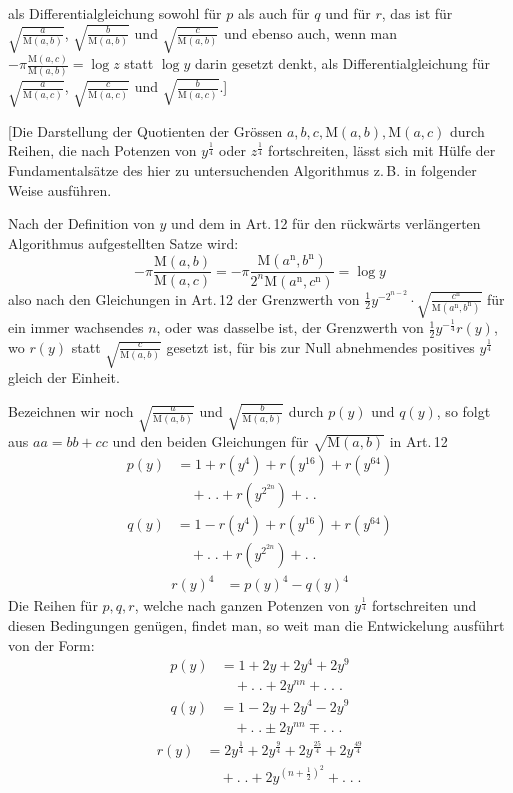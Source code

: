 %
als Differentialgleichung sowohl für $p$ als auch für $q$ und für $r$, das ist für
$\surd{\frac{a}{\mathrm M(a,b)}}$, $\surd{\frac{b}{\mathrm M(a,b)}}$ und
$\surd{\frac{c}{\mathrm M(a,b)}}$ und ebenso auch, wenn man
$-\pi\frac{\mathrm M(a,c)}{\mathrm M(a,b)}=\log z$ statt $\log y$ darin gesetzt denkt,
als Differentialgleichung für $\surd{\frac{a}{\mathrm M(a,c)}}$,
$\surd{\frac{c}{\mathrm M(a,c)}}$ und $\surd{\frac{b}{\mathrm M(a,c)}}$.]

[Die Darstellung der Quotienten der Grössen $a,b,c,\mathrm M(a,b),\mathrm M(a,c)$ durch
Reihen, die nach Potenzen von $y^{\frac14}$ oder $z^{\frac14}$ fortschreiten, lässt sich mit Hülfe
der Fundamentalsätze des hier zu untersuchenden Algorithmus z.\,B. in folgender
Weise ausführen.

Nach der Definition von $y$ und dem in Art.\,12 für den rückwärts verlängerten Algorithmus aufgestellten Satze wird:
\[
-\pi\frac{\mathrm M(a,b)}{\mathrm M(a,c)}
=-\pi\frac{\mathrm M(a^{\mathrm n},b^{\mathrm n})}{2^n\mathrm M(a^{\mathrm n},c^{\mathrm n})}=\log y
\]
also nach den Gleichungen in Art.\,12 der Grenzwerth von
$\frac12y^{-2^{n-2}}\cdot\surd{\frac{c^{\mathrm n}}{\mathrm M(a^{\mathrm n},b^{\mathrm n})}}$ für ein
immer wachsendes $n$, oder was dasselbe ist, der Grenzwerth von $\frac12y^{-\frac14}r(y)$,
wo $r(y)$ statt $\surd{\frac{c}{\mathrm M(a,b)}}$ gesetzt ist, für bis zur Null abnehmendes positives $y^{\frac14}$
gleich der Einheit.

Bezeichnen wir noch $\surd{\frac{a}{\mathrm M(a,b)}}$ und $\surd{\frac{b}{\mathrm M(a,b)}}$ durch $p(y)$ und $q(y)$, so folgt
aus $aa=bb+cc$ und den beiden Gleichungen für $\surd{\mathrm M(a,b)}$ in Art.\,12
\[
\begin{aligned}p(y)&=1+r(y^4)+r(y^{16})+r(y^{64})\\&\quad+.\;.+r(y^{2^{2n}})+.\;.\end{aligned}
\]
\[
\begin{aligned}q(y)&=1-r(y^4)+r(y^{16})+r(y^{64})\\&\quad+.\;.+r(y^{2^{2n}})+.\;.\end{aligned}
\]
\[
\begin{aligned}r(y)^4&=p(y)^4-q(y)^4\end{aligned}
\]
Die Reihen für $p,q,r$, welche nach ganzen Potenzen von $y^{\frac14}$ fortschreiten und diesen Bedingungen genügen, findet man, so weit man die Entwickelung ausführt von der Form:
\[
\begin{aligned}p(y)&=1+2y+2y^4+2y^9\\&\quad+.\;.+2y^{nn}+.\;.\;.\end{aligned}
\]
\[
\begin{aligned}q(y)&=1-2y+2y^4-2y^9\\&\quad+.\;.\pm2y^{nn}\mp.\;.\;.\end{aligned}
\]
\[
\begin{aligned}r(y)&=2y^{\frac14}+2y^{\frac94}+2y^{\frac{25}4}+2y^{\frac{49}4}\\&\quad+.\;.+2y^{(n+\frac12)^2}+.\;.\;.\end{aligned}
\]


